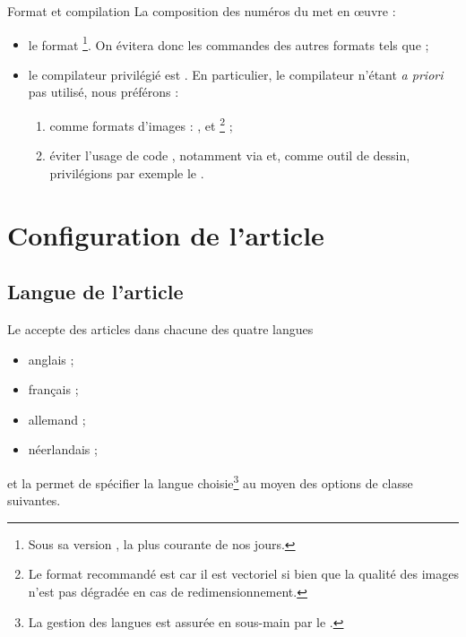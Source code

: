 \documentclass[french,nolocaltoc]{nwejmart}
\newtheorem[title=Fait,style=definition]{fact}
\begin{document}
\begin{dbwarning}{Format et compilation }{}
  La composition des numéros du \nwejm*{} met en œuvre :
  \begin{itemize}
  \item le format \footnote{Sous sa version , la
      plus courante de nos jours.}. On évitera donc les commandes des autres
    formats tels que  ;
  \item le compilateur privilégié est . En particulier, le
    compilateur  n'étant \emph{a priori} pas utilisé, nous
    préférons :
    \begin{enumerate}
    \item comme formats d'images : ,  et
      \footnote{Le format recommandé est  car il est
        vectoriel si bien que la qualité des images n'est pas dégradée en cas de
        redimensionnement.} ;
    \item éviter l'usage de code , notamment via
       et, comme outil de dessin, privilégions par exemple le
      .
    \end{enumerate}
  \end{itemize}
\end{dbwarning}

\section{Configuration de l'article}

\subsection{Langue de l'article}
\label{sec:langue-de-larticle}

Le \nwejm{} accepte des articles dans chacune des quatre langues
\begin{itemize}
\item anglais ;
\item français ;
\item allemand ;
\item néerlandais ;
\end{itemize}
et la \nwejmauthorcl{} permet de spécifier la langue choisie\footnote{La gestion
  des langues est assurée en sous-main par le .} au moyen des
options de classe suivantes.
\end{document}
